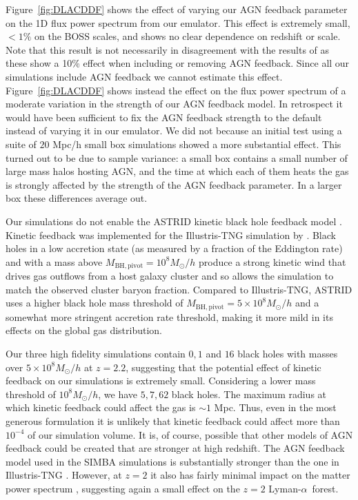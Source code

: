 \documentclass[a4paper,11pt]{article}
\newcommand{\Lya}{Lyman-$\alpha$}
\begin{document}
Figure~\ref{fig:DLACDDF} shows the effect of varying our AGN feedback parameter on the 1D flux power spectrum from our emulator. This effect is extremely small, $<1\%$ on the BOSS scales, and shows no clear dependence on redshift or scale. Note that this result is not necessarily in disagreement with the results of \cite{Viel:2013, Chabanier:2020} as these show a 10\% effect when including or removing AGN feedback. Since all our simulations include AGN feedback we cannot estimate this effect. Figure~\ref{fig:DLACDDF} shows instead the effect on the flux power spectrum of a moderate variation in the strength of our AGN feedback model.
In retrospect it would have been sufficient to fix the AGN feedback strength to the default instead of varying it in our emulator. We did not because an initial test using a suite of $20$ Mpc/h small box simulations showed a more substantial effect. This turned out to be due to sample variance: a small box contains a small number of large mass halos hosting AGN, and the time at which each of them heats the gas is strongly affected by the strength of the AGN feedback parameter. In a larger box these differences average out.


Our simulations do not enable the ASTRID kinetic black hole feedback model \cite{Ni:2023}. Kinetic feedback was implemented for the Illustris-TNG simulation by \cite{Weinberger:2017}. Black holes in a low accretion state (as measured by a fraction of the Eddington rate) and with a mass above $M_\mathrm{BH, pivot} = 10^8 M_\odot/h$ produce a strong kinetic wind that drives gas outflows from a host galaxy cluster and so allows the simulation to match the observed cluster baryon fraction. Compared to Illustris-TNG, ASTRID uses a higher black hole mass threshold of $M_\mathrm{BH, pivot} = 5\times 10^8 M_\odot/h$ and a somewhat more stringent accretion rate threshold, making it more mild in its effects on the global gas distribution.

Our three high fidelity simulations contain $0, 1$ and $16$ black holes with masses over $5\times 10^8 M_\odot/h$ at $z=2.2$, suggesting that the potential effect of kinetic feedback on our simulations is extremely small. Considering a lower mass threshold of $10^8 M_\odot/h$, we have $5, 7, 62$ black holes. The maximum radius at which kinetic feedback could affect the gas is $\sim 1$ Mpc. Thus, even in the most generous formulation it is unlikely that kinetic feedback could affect more than $10^{-4}$ of our simulation volume. It is, of course, possible that other models of AGN feedback could be created that are stronger at high redshift. The AGN feedback model used in the SIMBA simulations \cite{SIMBA} is substantially stronger than the one in Illustris-TNG \cite{Tillman:2022}. However, at $z=2$ it also has fairly minimal impact on the matter power spectrum \cite{CAMELS}, suggesting again a small effect on the $z=2$ \Lya~forest.
\end{document}
